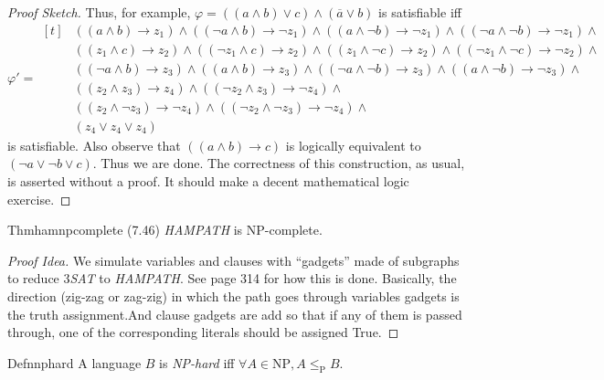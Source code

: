 \begin{proof}[Proof Sketch]
  Thus, for example, $\varphi=((a\wedge b)\vee c)\wedge(\overline{a}\vee b)$ is satisfiable iff
  \[
    \varphi' =
    \begin{aligned}[t]
       & ((a \land b) \rightarrow z_1) \land
      ((\lnot a \land b) \rightarrow \lnot z_1) \land
      ((a \land \lnot b) \rightarrow \lnot z_1) \land
      ((\lnot a \land \lnot b) \rightarrow \lnot z_1) \land     \\
       & ((z_1 \land c) \rightarrow z_2) \land
      ((\lnot z_1 \land c) \rightarrow z_2) \land
      ((z_1 \land \lnot c) \rightarrow z_2) \land
      ((\lnot z_1 \land \lnot c) \rightarrow \lnot z_2) \land   \\
       & ((\neg a \land b) \rightarrow z_3) \land
      ((a \land b) \rightarrow z_3) \land
      ((\neg a \land \lnot b) \rightarrow z_3) \land
      ((a \land \lnot b) \rightarrow \lnot z_3) \land           \\
       & ((z_2 \land z_3) \rightarrow z_4) \land
      ((\lnot z_2 \land z_3) \rightarrow \lnot z_4) \land       \\
       &
      ((z_2 \land \lnot z_3) \rightarrow \lnot z_4) \land
      ((\lnot z_2 \land \lnot z_3) \rightarrow \lnot z_4) \land \\
       & (z_4\vee z_4\vee z_4)
    \end{aligned}
  \]
  is satisfiable. Also observe that $((a\wedge b)\to c)$ is logically equivalent to $(\neg a\vee \neg b\vee c)$. Thus we are done. The correctness of this construction, as usual, is asserted without a proof. It should make a decent mathematical logic exercise.
\end{proof}

\begin{reference}{Thm}{hamnpcomplete}
  (7.46) \textit{HAMPATH} is NP-complete.
\end{reference}

\begin{proof}[Proof Idea]
  We simulate variables and clauses with ``gadgets'' made of subgraphs to reduce 3\textit{SAT} to \textit{HAMPATH}. See page 314 for how this is done. Basically, the direction (zig-zag or zag-zig) in which the path goes through variables gadgets is the truth assignment.And clause gadgets are add so that if any of them is passed through, one of the corresponding literals should be assigned True.
\end{proof}

\begin{reference}{Defn}{nphard}
  A language $B$ is \emph{NP-hard} iff $\forall A\in \mathrm{NP}, A\leq_{\mathrm{P}} B$.
\end{reference}


